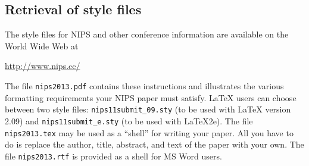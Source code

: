 \documentclass{article} %
\begin{document}






\subsection{Retrieval of style files}

The style files for NIPS and other conference information are available on the World Wide Web at
\begin{center}
   \url{http://www.nips.cc/}
\end{center}
The file \verb+nips2013.pdf+ contains these 
instructions and illustrates the
various formatting requirements your NIPS paper must satisfy. \LaTeX{}
users can choose between two style files:
\verb+nips11submit_09.sty+ (to be used with \LaTeX{} version 2.09) and
\verb+nips11submit_e.sty+ (to be used with \LaTeX{}2e). The file
\verb+nips2013.tex+ may be used as a ``shell'' for writing your paper. All you
have to do is replace the author, title, abstract, and text of the paper with
your own. The file
\verb+nips2013.rtf+ is provided as a shell for MS Word users.
\end{document}

